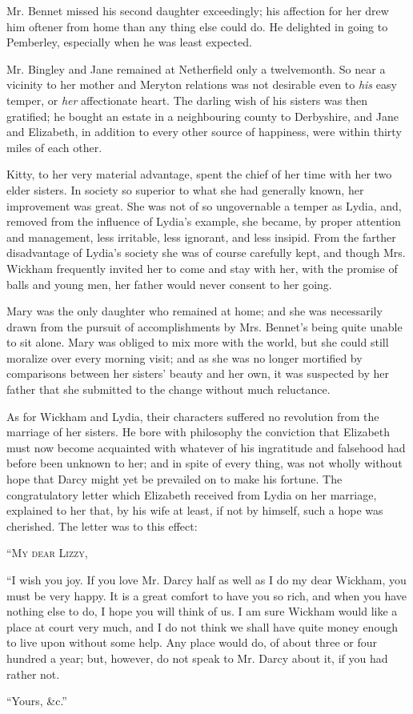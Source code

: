 Mr. Bennet missed his second daughter exceedingly;
his affection for her drew him oftener from home than
any thing else could do. He delighted in going to Pemberley,
especially when he was least expected.

Mr. Bingley and Jane remained at Netherfield only
a twelvemonth. So near a vicinity to her mother and
Meryton relations was not desirable even to \textit{his} easy
temper, or \textit{her} affectionate heart. The darling wish of
his sisters was then gratified; he bought an estate in a
neighbouring county to Derbyshire, and Jane and Elizabeth,
in addition to every other source of happiness, were
within thirty miles of each other.

Kitty, to her very material advantage, spent the chief
of her time with her two elder sisters. In society so
superior to what she had generally known, her improvement
was great. She was not of so ungovernable a temper
as Lydia, and, removed from the influence of Lydia’s
example, she became, by proper attention and management,
less irritable, less ignorant, and less insipid. From
the farther disadvantage of Lydia’s society she was of
course carefully kept, and though Mrs. Wickham
frequently invited her to come and stay with her, with the
promise of balls and young men, her father would never
consent to her going.

Mary was the only daughter who remained at home;
and she was necessarily drawn from the pursuit of accomplishments
by Mrs. Bennet’s being quite unable to sit
alone. Mary was obliged to mix more with the world,
but she could still moralize over every morning visit;
and as she was no longer mortified by comparisons between
her sisters’ beauty and her own, it was suspected by her
father that she submitted to the change without much
reluctance.

As for Wickham and Lydia, their characters suffered
no revolution from the marriage of her sisters. He bore
with philosophy the conviction that Elizabeth must now
become acquainted with whatever of his ingratitude and
falsehood had before been unknown to her; and in spite
of every thing, was not wholly without hope that Darcy
might yet be prevailed on to make his fortune. The congratulatory
letter which Elizabeth received from Lydia on
her marriage, explained to her that, by his wife at least,
if not by himself, such a hope was cherished. The letter
was to this effect:

\begin{letter}
“\textsc{My dear Lizzy},

“I wish you joy. If you love Mr. Darcy half as well
as I do my dear Wickham, you must be very happy.
It is a great comfort to have you so rich, and when you
have nothing else to do, I hope you will think of us. I am
sure Wickham would like a place at court very much, and
I do not think we shall have quite money enough to live
upon without some help. Any place would do, of about
three or four hundred a year; but, however, do not
speak to Mr. Darcy about it, if you had rather not.

\raggedleft “Yours, \&c.”
\end{letter}

